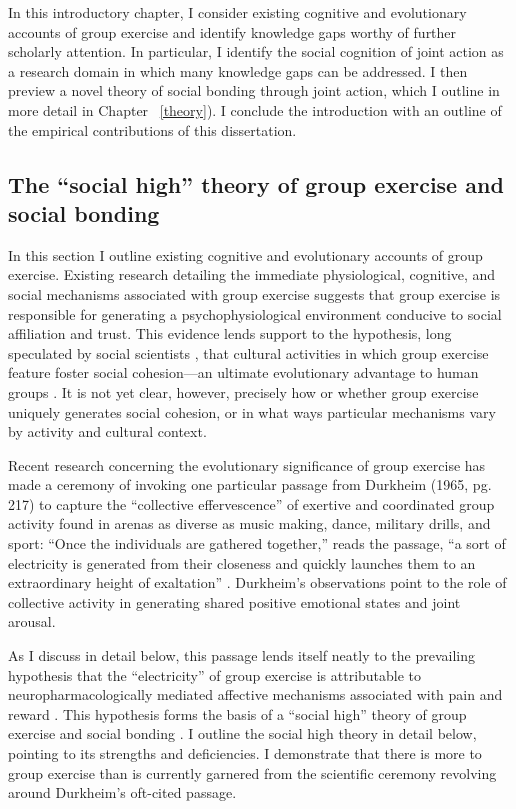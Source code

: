 \begin{CJK}{UTF8}{gbsn}
In this introductory chapter, I consider existing cognitive and evolutionary accounts of group exercise and identify knowledge gaps worthy of further scholarly attention.  In particular, I identify the  social cognition of joint action as a research domain in which many knowledge gaps can be addressed.  I then preview a novel theory of social bonding through joint action, which I outline in more detail in Chapter ~\ref{theory}).  I conclude the introduction with an outline of the empirical contributions of this dissertation.


\subsection{The ``social high'' theory of group exercise and social bonding}

In this section I outline existing cognitive and evolutionary accounts of group exercise.  Existing research detailing the immediate physiological, cognitive, and social mechanisms associated with group exercise suggests that group exercise is responsible for generating a psychophysiological environment conducive to social affiliation and trust.  This evidence lends support to the hypothesis, long speculated by social scientists \citep[see, for example][]{Durkheim1965}, that cultural activities in which group exercise feature foster social cohesion---an ultimate evolutionary advantage to human groups \citep{Dunbar2010,Whitehouse2004}.  It is not yet clear, however, precisely how or whether group exercise uniquely generates social cohesion, or in what ways particular mechanisms vary by activity and cultural context.

Recent research concerning the evolutionary significance of group exercise has made a ceremony of invoking one particular passage from Durkheim (1965, pg. 217) to capture the ``collective effervescence'' of exertive and coordinated group activity found in arenas as diverse as music making, dance, military drills, and sport:
``Once the individuals are gathered together,'' reads the passage, ``a sort of electricity is generated from their closeness and quickly launches them to an extraordinary height of exaltation'' \citep{McNeill1995,Konvalinka2011,Fischer2014,Mogan2017}.  Durkheim's observations point to the role of collective activity in generating shared positive emotional states and joint arousal.

As I discuss in detail below, this passage lends itself neatly to the prevailing hypothesis that the ``electricity'' of group exercise is attributable to neuropharmacologically mediated affective mechanisms associated with pain and reward \citep{Dunbar2008,Cohen2009,Fischer2014,Launay2016}. This hypothesis forms the basis of a ``social high'' theory of group exercise and social bonding \citep[][; hereafter simply ``social high theory'']{Cohen2017}.  I outline the social high theory in detail below, pointing to its strengths and deficiencies.  I demonstrate that there is more to group exercise than is currently garnered from the scientific ceremony revolving around Durkheim's oft-cited passage.



\end{CJK}
